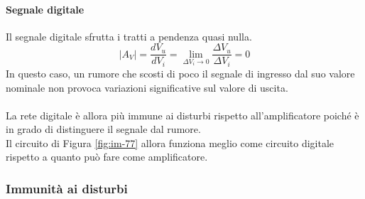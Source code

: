 \documentclass{article}
\numberwithin{equation}{subsection}
\begin{document}
	\paragraph{Segnale digitale}
	Il segnale digitale sfrutta i tratti a pendenza quasi nulla.
	$$|A_V| = \frac{dV_u}{dV_i} = \lim_{\Delta V_i \to 0} \frac{\Delta V_u}{\Delta V_i} = 0$$
	In questo caso, un rumore che scosti di poco il segnale di ingresso dal suo valore nominale non provoca variazioni significative sul valore di uscita.\\\\
	La rete digitale è allora più immune ai disturbi rispetto all’amplificatore poiché è in grado di distinguere il segnale dal rumore. \\
	Il circuito di Figura \ref{fig:im-77} allora funziona meglio come circuito digitale rispetto a quanto può fare come amplificatore.
	\subsubsection{Immunità ai disturbi}
\end{document}

